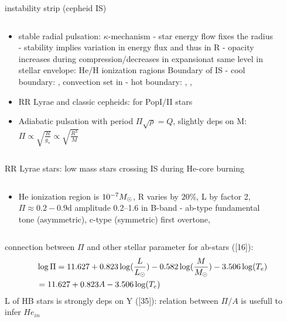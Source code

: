 \begin{frame}{instability strip (cepheid IS)}
\begin{columns}[T]
	\begin{column}{0.55\textwidth}
	\begin{itemize}
	\item stable radial pulsation: $\kappa$-mechanism - star energy flow fixes the radius - stability implies variation in energy flux and thus in R - opacity increases during compression/decreases in expansionat same level in stellar envelope: He/H ionization ragions
	Boundary of IS - cool boundary: , convection set in - hot boundary: , , 
	\item RR Lyrae and classic cepheids:  for PopI/II stars
	\item Adiabatic pulsation with period $\Pi\sqrt{\rho}=Q$, slightly deps on M: $\Pi\propto	\sqrt{\frac{R}{g_s}}\propto\sqrt{\frac{R^3}{M}}$ 
	\end{itemize}
	\end{column}
	\begin{column}{0.45\textwidth}
	\begin{figure}[!ht]
	\end{figure}
\end{column}\end{columns}
\end{frame}

\begin{frame}{RR Lyrae stars: low mass stars crossing IS during He-core burning}
\begin{columns}[T]
	\begin{column}{0.55\textwidth}
		\begin{itemize}
			\item He ionization region is $\num{e-7}M_{\odot}$, R varies by $20\%$, L by factor 2, $\Pi\approx0.2-0.9\si{\day}$ amplitude \SIrange{0.2}{1.6}{\mag} in B-band - ab-type fundamental tone (asymmetric), c-type (symmetric) first overtone,
		\end{itemize}
	\end{column}
	\begin{column}{0.45\textwidth}
		\begin{figure}[!ht]
		\end{figure}
\end{column}\end{columns}
connection between $\Pi$ and other stellar parameter for ab-stars ([16]):
\begin{align*}
&\log{\Pi}=11.627+0.823\log(\frac{L}{L_{\odot}})-0.582\log(\frac{M}{M_{\odot}})-3.506\log(T_e)\\
&=11.627+0.823A-3.506\log(T_e)
\end{align*}
L of HB stars is strongly deps on Y ([35]): relation between $\Pi/A$ is usefull to infer $He_{in}$
\end{frame}

